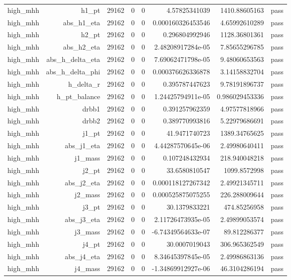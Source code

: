 \begin{table}[htbp]
{\begin{tabular}{lrrrrrrr}
high\_mhh & h1\_pt & 29162 & 0 & 0 & 4.57825341039 & 1410.88605163 & pass \\
high\_mhh & abs\_h1\_eta & 29162 & 0 & 0 & 0.000160326453546 & 4.65992610289 & pass \\
high\_mhh & h2\_pt & 29162 & 0 & 0 & 0.296804992946 & 1128.36801361 & pass \\
high\_mhh & abs\_h2\_eta & 29162 & 0 & 0 & 2.48208917284e-05 & 7.85655296785 & pass \\
high\_mhh & abs\_h\_delta\_eta & 29162 & 0 & 0 & 7.69062471798e-05 & 9.48060653563 & pass \\
high\_mhh & abs\_h\_delta\_phi & 29162 & 0 & 0 & 0.000376626336878 & 3.14158832704 & pass \\
high\_mhh & h\_delta\_r & 29162 & 0 & 0 & 0.395787447623 & 9.78191896737 & pass \\
high\_mhh & h\_pt\_balance & 29162 & 0 & 0 & 1.24425794911e-05 & 0.986029453336 & pass \\
high\_mhh & drbb1 & 29162 & 0 & 0 & 0.391257962359 & 4.97577818966 & pass \\
high\_mhh & drbb2 & 29162 & 0 & 0 & 0.389770993816 & 5.22979686691 & pass \\
high\_mhh & j1\_pt & 29162 & 0 & 0 & 41.9471740723 & 1389.34765625 & pass \\
high\_mhh & abs\_j1\_eta & 29162 & 0 & 0 & 4.44287570645e-06 & 2.49980640411 & pass \\
high\_mhh & j1\_mass & 29162 & 0 & 0 & 0.107248432934 & 218.940048218 & pass \\
high\_mhh & j2\_pt & 29162 & 0 & 0 & 33.6580810547 & 1099.8572998 & pass \\
high\_mhh & abs\_j2\_eta & 29162 & 0 & 0 & 0.000118127267342 & 2.49921345711 & pass \\
high\_mhh & j2\_mass & 29162 & 0 & 0 & 0.000525875075255 & 226.288009644 & pass \\
high\_mhh & j3\_pt & 29162 & 0 & 0 & 30.1379833221 & 474.85256958 & pass \\
high\_mhh & abs\_j3\_eta & 29162 & 0 & 0 & 2.11726473935e-05 & 2.49899053574 & pass \\
high\_mhh & j3\_mass & 29162 & 0 & 0 & -6.74349564633e-07 & 89.812286377 & pass \\
high\_mhh & j4\_pt & 29162 & 0 & 0 & 30.0007019043 & 306.965362549 & pass \\
high\_mhh & abs\_j4\_eta & 29162 & 0 & 0 & 8.34645397845e-05 & 2.49986863136 & pass \\
high\_mhh & j4\_mass & 29162 & 0 & 0 & -1.34869912927e-06 & 46.3104286194 & pass \\

\end{tabular}}
\end{table}
